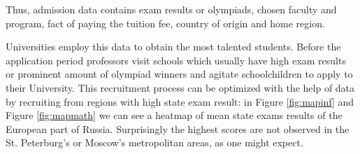 \documentclass{article}
\begin{document}
Thus, admission data contains exam results or olympiads, chosen faculty and program, fact of paying the tuition fee, country of origin and home region.

Universities employ this data to obtain the most talented students. Before the application period professors visit schools which usually have high exam results or prominent amount of olympiad winners and agitate schoolchildren to apply to their University. This recruitment process can be optimized with the help of data by recruiting from regions with high state exam result: in Figure \ref{fig:mapinf} and Figure \ref{fig:mapmath} we can see a heatmap of mean state exams results of the European part of Russia. Surprisingly the highest scores are not observed in the St. Peterburg's or Moscow's metropolitan areas, as one might expect.
\end{document}
